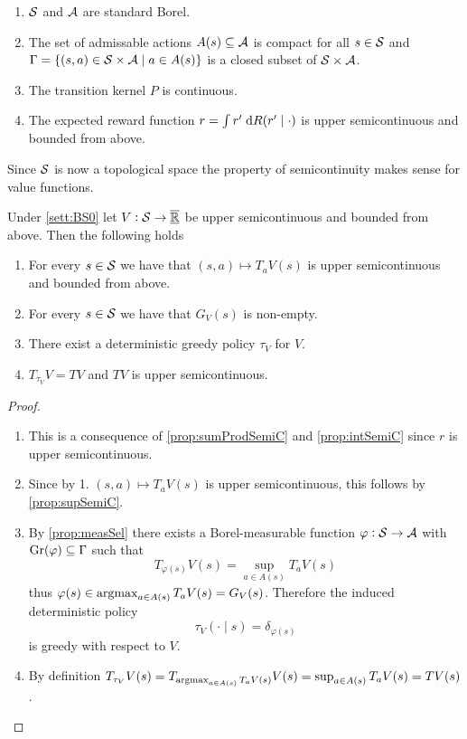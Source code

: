 \begin{sett}
  \leavevmode
  \begin{enumerate}
    \item $\mathcal{S}$ and $\mathcal{A}$ are standard Borel.
    \item The set of admissable actions 
      $A(s) \subseteq \mathcal{A}$ is compact for all $s \in \mathcal{S}$
      and $\Gamma = \{ (s, a) \in \mathcal{S} \times \mathcal{A} \mid a \in A(s) \}$
      is a closed subset of $\mathcal{S} \times \mathcal{A}$.
    \item The transition kernel $P$ is continuous.
    \item The expected reward function $r = \int r' \; \mathrm{d} R(r' \mid \cdot)$
      is upper semicontinuous and bounded from above.
  \end{enumerate}
  \label{sett:BS0}
\end{sett}

Since $\mathcal{S}$ is now a topological space the property of semicontinuity
makes sense for value functions.

\begin{prop}
  Under \cref{sett:BS0}
  let $V:\mathcal{S} \to \overline{\underline{\mathbb{R}}}$ be upper semicontinuous and bounded from above.
  Then the following holds
  \leavevmode
  \begin{enumerate}
    \item For every $s \in \mathcal{S}$ we have that
      $(s, a) \mapsto T_a V(s)$ is upper semicontinuous and bounded from above.
    \item For every $s \in \mathcal{S}$ we have that $G_V(s)$ is non-empty.
    \item There exist a deterministic greedy policy $\tau_V$ for $V$.
    \item $T_{\tau_V} V = TV$ and $TV$ is upper semicontinuous.
  \end{enumerate}
  \label{prop:greedyExi}
\end{prop}
\begin{proof}
  \leavevmode
  \begin{enumerate}
    \item This is a consequence of \cref{prop:sumProdSemiC}
      and \cref{prop:intSemiC} since $r$ is upper semicontinuous.
    \item Since by 1. $(s, a) \mapsto T_a V(s)$ is upper semicontinuous, this
      follows by \cref{prop:supSemiC}.
    \item By \cref{prop:measSel} there exists a Borel-measurable function
      $\varphi : \mathcal{S} \to \mathcal{A}$ with $\mathrm{Gr}(\varphi) \subseteq \Gamma$
      such that
      \[ T_{\varphi(s)} V(s) = \sup_{a \in A(s)} T_a V(s) \]
      thus $\varphi(s) \in \operatorname*{argmax}_{a \in A(s)} T_a V(s) = G_V(s)$.
      Therefore the induced deterministic policy
      \[ \tau_V(\cdot \mid s) = \delta_{\varphi(s)} \]
      is greedy with respect to $V$.
    \item By definition $T_{\tau_V} V(s) = T_{\operatorname*{argmax}_{a \in A(s)} T_a V(s)}
      V(s) = \sup_{a \in A(s)} T_a V(s) = TV(s)$.
  \end{enumerate}
\end{proof}

